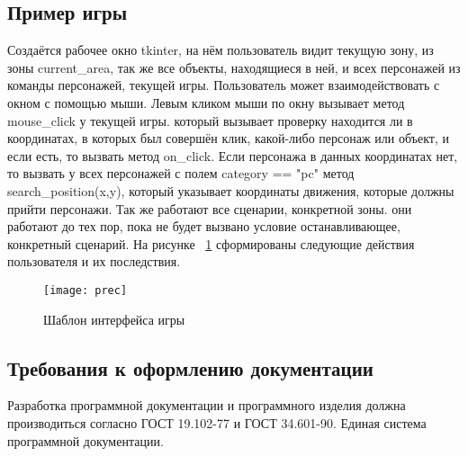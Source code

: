 \subsection{Пример игры}
Создаётся рабочее окно tkinter, на нём пользователь видит текущую зону, из зоны current\_area, так же все объекты, находящиеся в ней, и всех персонажей из команды персонажей, текущей игры. Пользователь может взаимодействовать с окном с помощью мыши. Левым кликом мыши по окну вызывает метод mouse\_click у текущей игры. который вызывает проверку находится ли в координатах, в которых был совершён клик, какой-либо персонаж или объект, и если есть, то вызвать метод on\_click. Если персонажа в данных координатах нет, то вызвать у всех персонажей с полем category == "pc" метод search\_position(x,y), который указывает координаты движения, которые должны прийти персонажи. Так же работают все сценарии, конкретной зоны. они работают до тех пор, пока не будет вызвано условие останавливающее, конкретный сценарий.
На рисунке ~\ref{prec:image} сформированы следующие действия пользователя и их последствия.
\begin{figure}[ht]
	\texttt{[image: prec]}
	\caption{Шаблон интерфейса игры}
	\label{prec:image}
\end{figure}

\subsection{Требования к оформлению документации}

Разработка программной документации и программного изделия должна производиться согласно ГОСТ 19.102-77 и ГОСТ 34.601-90. Единая система программной документации.
